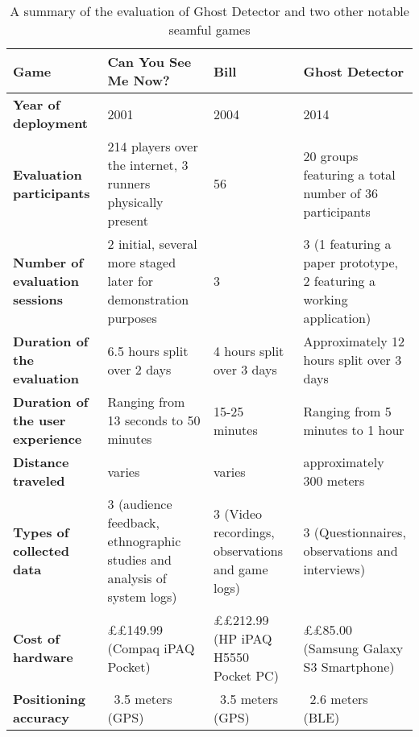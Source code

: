 \documentclass[prodmode,acmtomm]{acmsmall}
\begin{document}
\begin{table}[h]
\begin{center}
\setlength\extrarowheight{5pt}
\begin{tabular}{ | p{3.0cm} | p{3.0cm}  | p{3.0cm} | p{3.0cm} |}
\hline 
\textbf {Game} & \textbf{Can You See Me Now?} & \textbf{Bill} & \textbf{Ghost Detector} \\ \hline \hline 

\textbf{Year of deployment} & 2001 & 2004 & 2014 \\ \hline

\textbf{Evaluation participants} & 214 players over the internet, 3 runners physically present & 56 & 20 groups featuring a total number of 36 participants\\ \hline

\textbf{Number of evaluation sessions} & 2 initial, several more staged later for demonstration purposes & 3 & 3 (1 featuring a paper prototype, 2 featuring a working application)\\ \hline

\textbf{Duration of the evaluation} & 6.5 hours split over 2 days & 4 hours split over 3 days & Approximately 12 hours split over 3 days\\ \hline

\textbf{Duration of the user experience} & Ranging from 13 seconds to 50 minutes & 15-25 minutes & Ranging from 5 minutes to 1 hour\\ \hline 

\textbf{Distance traveled} & varies & varies & approximately 300 meters \\ \hline 

\textbf{Types of collected data} & 3 (audience feedback, ethnographic studies and analysis of system logs) & 3 (Video recordings, observations and game logs) & 3 (Questionnaires, observations and interviews) \\ \hline 

\textbf{Cost of hardware} & 
\pounds £149.99 (Compaq iPAQ Pocket) & 
\pounds£212.99 (HP iPAQ H5550 Pocket PC) & \pounds£85.00 (Samsung Galaxy S3 Smartphone) \\ \hline 

\textbf{Positioning accuracy} & 
~3.5 meters (GPS) & ~3.5 meters (GPS) & ~2.6 meters (BLE) \\ \hline 

\end{tabular}

\label{users_participating}
\textcolor{black}{
\caption{A summary of the evaluation of Ghost Detector and two other notable seamful games}
}
\end{center}
\end{table}
\end{document}
